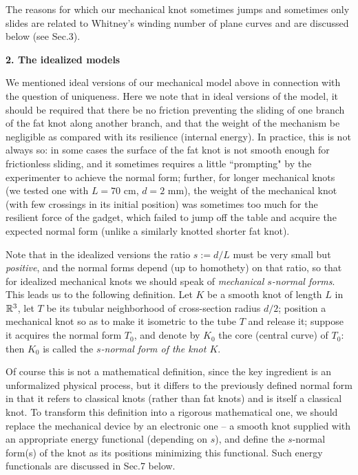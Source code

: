 \documentclass[12pt]{book}
\begin{document}
\medskip
The reasons for which our mechanical knot sometimes jumps and sometimes only slides are related to Whitney's winding number of plane curves and are discussed below 
(see  Sec.3).

\medskip 
{\bf 2. The idealized models}  

\smallskip
We mentioned ideal versions of our mechanical model above in connection with the question of uniqueness. Here we note that in ideal versions of the model, it should be required that there be no friction preventing the sliding of one branch of the fat knot along another branch, and that the weight of the mechanism be negligible as compared with its resilience (internal energy). In practice, this is not always so: in some cases the surface of the fat knot is not smooth enough for frictionless sliding, and it sometimes requires a little ``prompting" by the experimenter to achieve the normal form; further, for longer mechanical knots (we tested one with $L=70$ cm, $d=2$ mm), the weight of the mechanical knot (with few crossings in its initial position) was sometimes too much for the resilient force of the gadget, which failed to jump off the table and acquire the expected  normal form (unlike a similarly knotted shorter fat knot).

Note that in the idealized versions the ratio $s:=d/L$ must be very small but {\it positive}, and the normal forms depend (up to homothety) on that ratio, so that for idealized mechanical knots we should speak of {\it mechanical $s$-normal forms}. This leads us to the following definition. Let $K$ be a smooth knot of length $L$ in $\mathbb R^3$, let $T$ be its tubular neighborhood of cross-section radius $d/2$; position a mechanical knot so as to make it isometric to the tube $T$ and release it; suppose it acquires the normal form 
$T_0$, and denote by $K_0$ the core (central curve) of $T_0$: then $K_0$ is called the 
{\it $s$-normal form of the knot $K$}. 
 
Of course this is not a mathematical definition, since the key ingredient is an unformalized  physical process, but it differs to the previously defined normal form in that it refers to classical knots (rather than fat knots) and is itself a classical knot. To transform this definition into a rigorous mathematical one, we should replace the mechanical device   by an electronic one -- a smooth knot supplied with an appropriate energy functional (depending on $s$), and define the $s$-normal form(s) of the knot as its positions minimizing this functional. Such energy functionals are discussed in Sec.7 
below.  
\end{document}

